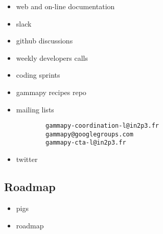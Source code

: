 \begin{itemize}
	\item web and on-line documentation 	
	\item slack
	\item github discussions
	\item weekly developers calls
	\item coding sprints 
	\item gammapy recipes repo
	\item mailing lists 
		\begin{verbatim}
		gammapy-coordination-l@in2p3.fr 
		gammapy@googlegroups.com 
		gammapy-cta-l@in2p3.fr
		\end{verbatim}
	\item twitter
\end{itemize}

\subsection{Roadmap}
\label{ssec:roadmap}

\begin{itemize}
	\item pigs
	\item roadmap
\end{itemize}
